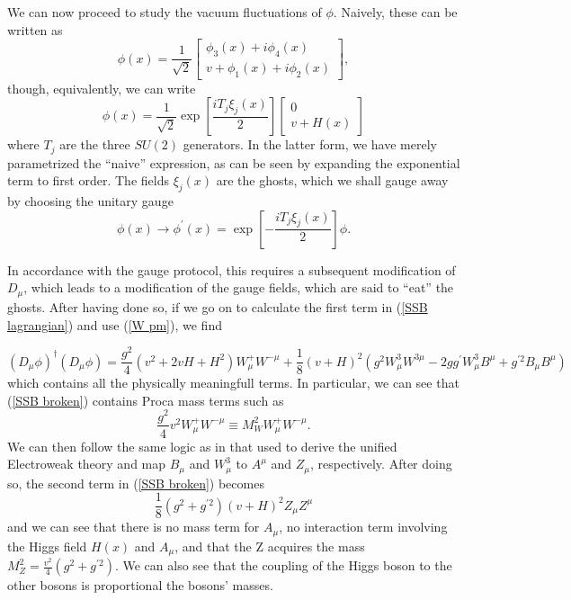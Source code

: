 \documentclass[10pt,a4paper]{book}
\begin{document}
We can now proceed to study the vacuum fluctuations of $\phi$. Naively, these can be written as
\begin{equation}
\phi (x) = \frac{1}{\sqrt{2}}\begin{bmatrix}
\phi_3(x) + i\phi_4(x) \\
v + \phi_1(x) + i\phi_2(x)
\end{bmatrix},
\end{equation}
though, equivalently, we can write
\begin{equation}
\phi (x) = \frac{1}{\sqrt{2}}\exp\left[\frac{iT_j\xi_j(x)}{2} \right]\begin{bmatrix}
0 \\
v + H(x)
\end{bmatrix}
\end{equation}
where $T_j$ are the three $SU(2)$ generators. In the latter form, we have merely parametrized the ``naive'' expression, as can be seen by expanding the exponential term to first order. The fields $\xi_j(x)$ are the ghosts, which we shall gauge away by choosing the unitary gauge
\begin{equation}
\phi (x) \rightarrow \phi^\prime (x) = \exp\left[-\frac{iT_j\xi_j(x)}{2} \right]\phi.
\end{equation}  

In accordance with the gauge protocol, this requires a subsequent modification of $D_\mu$, which leads to a modification of the gauge fields, which are said to ``eat'' the ghosts. After having done so, if we go on to calculate the first term in (\ref{SSB lagrangian}) and use (\ref{W pm}), we find

\begin{equation}
\label{SSB broken}
(D_\mu\phi)^\dagger(D_\mu\phi) = \frac{g^2}{4}\left(v^2 + 2vH + H^2\right)W^+_\mu W^{- \mu} + \frac{1}{8}(v + H)^2 \left( g^2 W^3_\mu W^{3\mu} - 2gg^\prime W^3_\mu B^\mu + g^{\prime 2}B_\mu B^\mu \right)
\end{equation}
which contains all the physically meaningfull terms. In particular, we can see that (\ref{SSB broken}) contains Proca mass terms such as 
\begin{equation}
\frac{g^2}{4}v^2 W_\mu^+ W^{-\mu} \equiv M^2_W W_\mu^+ W^{-\mu}.
\end{equation}
We can then follow the same logic as in that used to derive the unified Electroweak theory and map $B_\mu$ and $W^3_\mu$ to $A^\mu$ and $Z_\mu$, respectively. After doing so, the second term in (\ref{SSB broken}) becomes
\begin{equation}
\frac{1}{8}(g^2 + g^{\prime 2})(v + H)^2 Z_\mu Z^\mu
\end{equation}
and we can see that there is no mass term for $A_\mu$, no interaction term involving the Higgs field $H(x)$ and $A_\mu$, and that the Z acquires the mass $M^2_Z = \frac{v^2}{4}(g^2 + g^{\prime 2})$. We can also see that the coupling of the Higgs boson to the other bosons is proportional the bosons' masses. 
\end{document}
